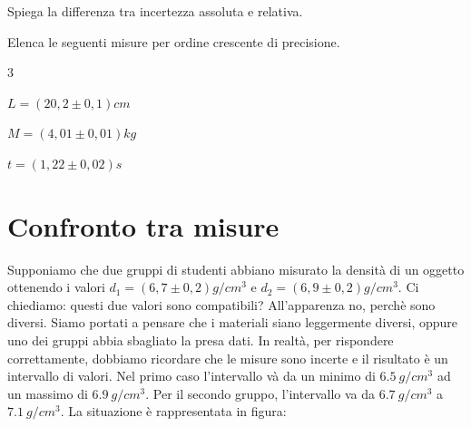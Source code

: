 \begin{esercizio}
Spiega la differenza tra incertezza assoluta e relativa.
\end{esercizio}

\begin{esercizio}
Elenca le seguenti misure per ordine crescente di precisione.
\begin{multicols}{3}
\begin{elenco}
 \item[a)] $L=\left(20,2 \pm 0,1\right)\si{cm}$
 \item[b)] $M=\left(4,01 \pm 0,01\right)\si{kg}$
 \item[c)] $t=\left(1,22 \pm 0,02\right)\si{s}$ \\
\end{elenco}
\end{multicols}

\end{esercizio}


\section{Confronto tra misure}
Supponiamo che due gruppi di studenti abbiano misurato la densità di un oggetto ottenendo i valori $d_1=\left(6,7 \pm 0,2\right)\si{g/cm^3}$ e $d_2=\left(6,9 \pm 0,2\right)\si{g/cm^3}$. Ci chiediamo: questi due valori sono compatibili? All'apparenza no, perchè sono diversi. Siamo portati a pensare che i materiali siano leggermente diversi, oppure uno dei gruppi abbia sbagliato la presa dati. In realtà, per rispondere correttamente, dobbiamo ricordare che le misure sono incerte e il risultato è un intervallo di valori. Nel primo caso l'intervallo và da un minimo di $\SI{6,5}{g/	cm^3}$ ad un massimo di $\SI{6,9}{g/cm^3}$. Per il secondo gruppo, l'intervallo va da $\SI{6,7}{g/cm^3}$ a $\SI{7,1}{g/cm^3}$. La situazione è rappresentata in figura:

